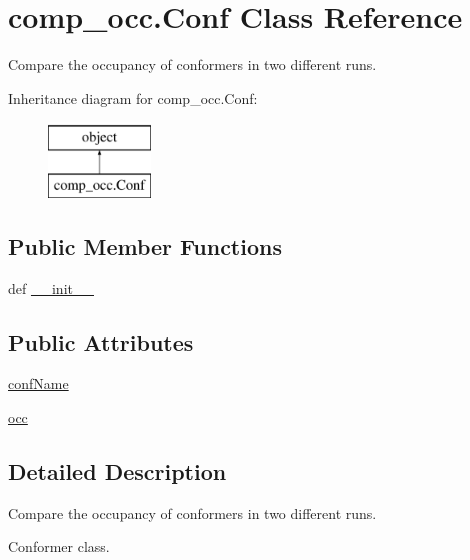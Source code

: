 \hypertarget{classcomp__occ_1_1_conf}{\section{comp\-\_\-occ.\-Conf Class Reference}
\label{classcomp__occ_1_1_conf}
}


Compare the occupancy of conformers in two different runs.  


Inheritance diagram for comp\-\_\-occ.\-Conf\-:\begin{figure}[H]
\begin{center}
\leavevmode
\includegraphics[height=2.000000cm]{classcomp__occ_1_1_conf}
\end{center}
\end{figure}
\subsection*{Public Member Functions}
\begin{DoxyCompactItemize}
\item 
def \hyperlink{classcomp__occ_1_1_conf_a8bcfb9626fe1990cd68bb3701a36fb5f}{\-\_\-\-\_\-init\-\_\-\-\_\-}
\end{DoxyCompactItemize}
\subsection*{Public Attributes}
\begin{DoxyCompactItemize}
\item 
\hyperlink{classcomp__occ_1_1_conf_ac424346df2bb8a9b7548c6c5768633a4}{conf\-Name}
\item 
\hyperlink{classcomp__occ_1_1_conf_a6b6a4ed6f56d67c757fe8851386fd674}{occ}
\end{DoxyCompactItemize}


\subsection{Detailed Description}
Compare the occupancy of conformers in two different runs. 

Conformer class. 

